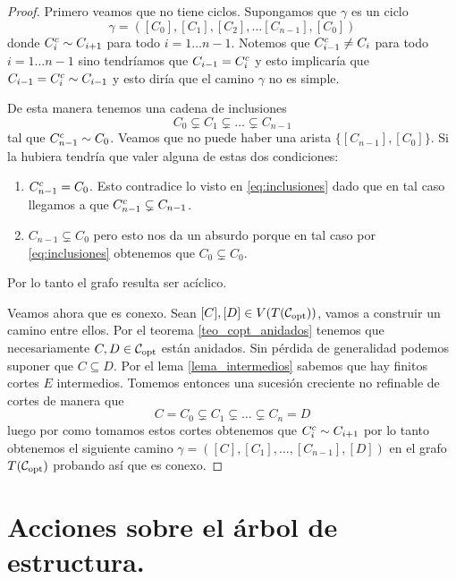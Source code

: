 \documentclass[tesis.tex]{subfiles}
\begin{document}
\begin{proof}
	Primero veamos que no tiene ciclos.
	Supongamos que $\gamma$	es un ciclo
	\[
		\gamma = ([C_0], [C_1], [C_2], \dots [C_{n-1}], [C_0])
	\]
	donde $C^{c}_{i} \sim C_{i+1}$ para todo $i=1 \dots n-1$.
	Notemos que $C^{c}_{i-1} \neq C_{i}$ para todo $i=1 \dots n-1$ sino tendríamos que $C_{i-1} = C_{i}^{c}$ y esto implicaría que $C_{i-1} = C_{i}^{c} \sim C_{i-1}$
	y esto diría que el camino $\gamma$ no es simple.
	
	De esta manera tenemos una cadena de inclusiones
	\begin{equation}\label{eq:inclusiones}
			C_0 \subsetneq C_1 \subsetneq \dots  \subsetneq C_{n-1}
	\end{equation}
	tal que $C_{n-1}^{c} \sim C_0$.
	Veamos que no puede haber una arista $\{[{ C_{n-1}}], [C_0]\}$.
	Si la hubiera tendría que valer alguna de estas dos condiciones:
	\begin{enumerate}
		\item $C_{n-1}^{c} = C_{0}$. 
		Esto contradice lo visto en \ref{eq:inclusiones} dado que en tal caso
		 llegamos a que $C_{n-1}^{c} \subsetneq C_{n-1}$.
		
		\item ${C_{n-1}} \subsetneq C_{0}$ pero esto nos da un absurdo porque en tal caso por \ref{eq:inclusiones} obtenemos que $C_{0} \subsetneq C_{0}$.
	\end{enumerate}
	Por lo tanto el grafo resulta ser acíclico.
	
	Veamos ahora que es conexo.
	Sean $[C], [D] \in V(T({\cal C}_{\text{opt}}))$, vamos a construir un camino entre ellos.
	Por el teorema \ref{teo_copt_anidados} tenemos que necesariamente $C,D \in {\cal C}_{\text{opt}}$ están anidados.
	Sin pérdida de generalidad podemos suponer que $C \subseteq D$.
	Por el lema \ref{lema_intermedios} sabemos que hay finitos cortes $E$ intermedios.
	Tomemos entonces una sucesión creciente no refinable de cortes de manera que  
	\[
		C=C_0 \subsetneq C_1 \subsetneq \dots \subsetneq C_n = D
	\]
	luego por como tomamos estos cortes obtenemos que $C^{c}_i \sim C_{i+1}$ por lo tanto obtenemos el siguiente camino $\gamma = ([C],[C_1], \dots, [C_{n-1}],[D])$ en el grafo $T({\cal C}_{\text{opt}})$ probando así que es conexo.	
\end{proof}





\section{Acciones sobre el árbol de estructura.}\label{secc_accion_arbol_estr}
\end{document}
